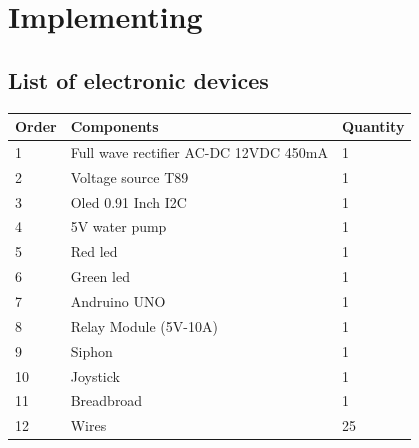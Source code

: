 \documentclass[12pt]{article}
\begin{document}
    \section{Implementing}
        \subsection{List of electronic devices}
            \begin{table}[H]
                \centering
                \begin{tabular}{|l|l|l|}
                    \hline
                            Order & Components                            & Quantity\\ \hline
                            1   & Full wave rectifier AC-DC 12VDC 450mA & 1        \\ \hline
                            2   & Voltage source T89                    & 1        \\ \hline
                            3   & Oled 0.91 Inch I2C                    & 1        \\ \hline
                            4   & 5V water pump                         & 1        \\ \hline
                            5   & Red led                               & 1        \\ \hline
                            6   & Green led                             & 1        \\ \hline
                            7   & Andruino UNO                          & 1        \\ \hline
                            8   & Relay Module (5V-10A)                 & 1        \\ \hline
                            9   & Siphon                                & 1        \\ \hline
                            10  & Joystick                              & 1        \\ \hline
                            11  & Breadbroad                            & 1        \\ \hline
                            12  & Wires                                 & 25        \\ \hline
                \end{tabular}
            \end{table}
\end{document}
